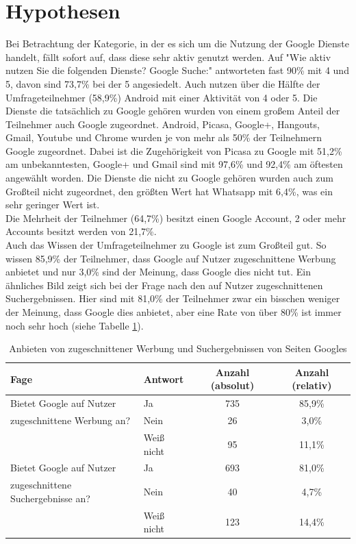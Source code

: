 \section{Hypothesen}
Bei Betrachtung der Kategorie, in der es sich um die Nutzung der Google Dienste handelt, fällt sofort auf, dass diese sehr aktiv genutzt werden. Auf "Wie aktiv nutzen Sie die folgenden Dienste? Google Suche:" antworteten fast 90\% mit 4 und 5, davon sind 73,7\% bei der 5 angesiedelt. Auch nutzen über die Hälfte der Umfrageteilnehmer (58,9\%) Android mit einer Aktivität von 4 oder 5.
Die Dienste die tatsächlich zu Google gehören wurden von einem großem Anteil der Teilnehmer auch Google zugeordnet. Android, Picasa, Google+, Hangouts, Gmail, Youtube und Chrome wurden je von mehr als 50\% der Teilnehmern Google zugeordnet. Dabei ist die Zugehörigkeit von Picasa zu Google mit 51,2\% am unbekanntesten, Google+ und Gmail sind mit 97,6\% und 92,4\% am öftesten angewählt worden. Die Dienste die nicht zu Google gehören wurden auch zum Großteil nicht zugeordnet, den größten Wert hat Whatsapp mit 6,4\%, was ein sehr geringer Wert ist.\\
Die Mehrheit der Teilnehmer (64,7\%) besitzt einen Google Account, 2 oder mehr Accounts besitzt werden von 21,7\%.\\
Auch das Wissen der Umfrageteilnehmer zu Google ist zum Großteil gut. So wissen 85,9\% der Teilnehmer, dass Google auf Nutzer zugeschnittene Werbung anbietet und nur 3,0\% sind der Meinung, dass Google dies nicht tut. Ein ähnliches Bild zeigt sich bei der Frage nach den auf Nutzer zugeschnittenen Suchergebnissen. Hier sind mit 81,0\% der Teilnehmer zwar ein bisschen weniger der Meinung, dass Google dies anbietet, aber eine Rate von über 80\% ist immer noch sehr hoch (siehe Tabelle \ref{fittingAdsAndSearch}).\\
\begin{table}
	\begin{tabular}[]{ l | l | c | c}
		\hline
		Fage & Antwort & Anzahl (absolut) & Anzahl (relativ)\\ \hline \hline
		Bietet Google auf Nutzer& Ja & 735 & 85,9\%\\
		zugeschnittene Werbung an? & Nein & 26 & 3,0\%\\
		& Weiß nicht & 95 & 11,1\% \\
		\hline
		Bietet Google auf Nutzer& Ja & 693 & 81,0\% \\
		zugeschnittene Suchergebnisse an? & Nein & 40 & 4,7\% \\
		& Weiß nicht & 123 & 14,4\% \\
		 \hline
	\end{tabular}
	\caption{Anbieten von zugeschnittener Werbung und Suchergebnissen von Seiten Googles}\label{fittingAdsAndSearch}
\end{table}\\
